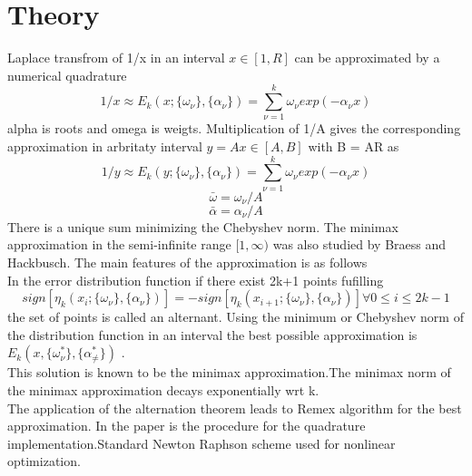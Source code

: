 \documentclass[10pt, draft]{article}
\begin{document}
\section{Theory}
Laplace transfrom of 1/x in an interval $x \in [1, R]$ can be approximated by a numerical quadrature
\[1/x \approx E_k(x; \{\omega_\nu\},\{\alpha_\nu\}) = \sum_{\nu=1}^k \omega_\nu exp(-\alpha_\nu x)\]
alpha is roots and omega is weigts.  Multiplication of 1/A gives the corresponding approximation in arbritaty interval $y=Ax\in [A,B]$ with B  = AR as
\[1/y \approx E_k (y; \{\omega_\nu\},\{\alpha_\nu\}) = \sum_{\nu=1}^k \omega_\nu exp(-\alpha_\nu x)\]
\[\bar{\omega} = \omega_\nu / A\]
\[\bar{\alpha} = \alpha_\nu / A\] 
There is a unique sum minimizing the Chebyshev norm.  The minimax approximation in the semi-infinite range $[1, \infty)$ was also studied by Braess and Hackbusch.  The main features of the approximation is as follows\\
In the error distribution function if there exist 2k+1 points fufilling 
\[sign[\eta_k (x_i ; \{\omega_\nu\},\{\alpha_\nu\})] = -sign[\eta_k(x_{i+1} ; \{\omega_\nu\},\{\alpha_\nu\})]  \forall 0 \leq i \leq 2k-1\]
the set of points is called an alternant.  Using the minimum or Chebyshev norm of the distribution function in an interval the best possible approximation is $E_k(x, \{\omega^*_\nu\},\{\alpha^*_\ne\})$ .\\
This solution is known to be the minimax approximation.The minimax norm of the minimax approximation decays exponentially wrt k.\\
The application of the alternation theorem leads to Remex algorithm for the best approximation.  In the paper is the procedure for the quadrature implementation.Standard Newton Raphson scheme used for nonlinear optimization.  
\end{document}

